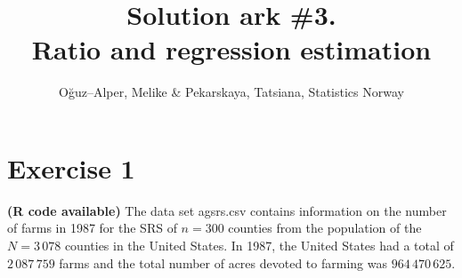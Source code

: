 \documentclass[12pt]{article}
\begin{document}
\title{Solution ark \#3.\\ Ratio and regression estimation}
\author{O\u{g}uz--Alper, Melike \& Pekarskaya, Tatsiana, Statistics Norway}
\maketitle

\section*{Exercise 1}
\textbf{\color{ForestGreen}(R code available)} The data set agsrs.csv contains information on the number of farms in 1987 for the SRS of $n = 300$ counties from the population of the $N = 3\,078$ counties in the
United States. In 1987, the United States had a total of $2\,087\,759$ farms and the total number of acres devoted to farming was $964\,470\,625$.
\end{document}
